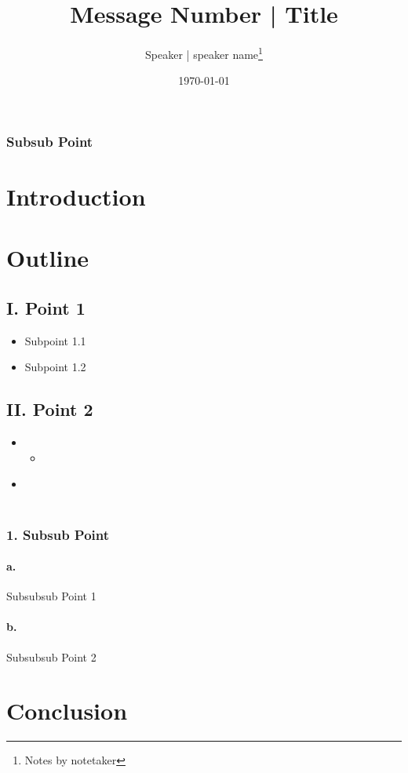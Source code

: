 \documentclass{article}
\newenvironment{notesoutline}{
  \begin{itemize}[label=--,left=1em,labelsep=1em]
}{
  \end{itemize}
}
\begin{document}
\title{Message Number | Title}
\author{Speaker | speaker name\thanks{Notes by notetaker}}
\date{\today}

\maketitle

\subsubsection*{Subsub Point}
\lipsum[1]

\section*{Introduction}
\lipsum[1]

\section*{Outline}

\subsection*{I. Point 1}
\lipsum[1]
\begin{notesoutline}
  \item[A.] Subpoint 1.1
  \item[B.] Subpoint 1.2
\end{notesoutline}

\subsection*{II. Point 2}
\begin{notesoutline}
  \item[A.] 
    \lipsum[1]
    \begin{notesoutline}
      \item[1.] 
        \lipsum[5]
    \end{notesoutline}
  \item[B.] 
    \lipsum[2] \\ \\
    \lipsum[1]
\end{notesoutline}

\subsubsection*{1. Subsub Point}
\begin{notesoutline}
  \paragraph{a.} Subsubsub Point 1
  \lipsum[3]
  
  \paragraph{b.} Subsubsub Point 2
  \lipsum[4]
\end{notesoutline}

\section*{Conclusion}
\lipsum[2]
\end{document}
